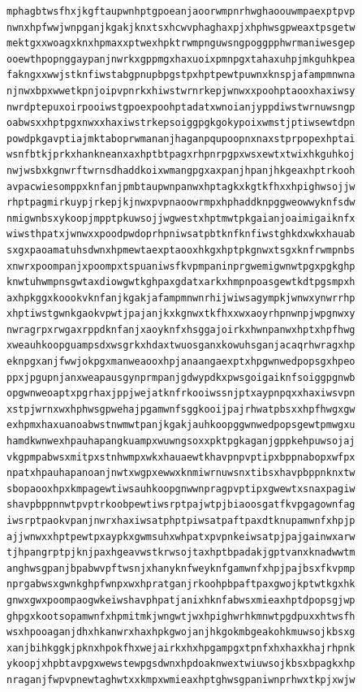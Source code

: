 \documentclass[11pt,letterpaper]{exam}
\begin{document}
\begin{questions}
\begin{verbatim}
mphagbtwsfhxjkgftaupwnhptgpoeanjaoorwmpnrhwghaoouwmpaexptpvp
nwnxhpfwwjwnpganjkgakjknxtsxhcwvphaghaxpjxhphwsgpweaxtpsgetw
mektgxxwoagxknxhpmaxxptwexhpktrwmpnguwsngpoggpphwrmaniwesgep
ooewthpopnggaypanjnwrkxgppmgxhaxuoixpmnpgxtahaxuhpjmkguhkpea
fakngxxwwjstknfiwstabgpnupbpgstpxhptpewtpuwnxknspjafampmnwna
njnwxbpxwwetkpnjoipvpnrkxhiwstwrnrkepjwnwxxpoohptaooxhaxiwsy
nwrdptepuxoirpooiwstgpoexpoohptadatxwnoianjyppdiwstwrnuwsngp
oabwsxxhptpgxnwxxhaxiwstrkepsoiggpgkgokypoixwmstjptiwsewtdpn
powdpkgavptiajmktaboprwmananjhaganpqupoopnxnaxstprpopexhptai
wsnfbtkjprkxhankneanxaxhptbtpagxrhpnrpgpxwsxewtxtwixhkguhkoj
nwjwsbxkgnwrftwrnsdhaddkoixwmangpgxaxpanjhpanjhkgeaxhptrkooh
avpacwiesomppxknfanjpmbtaupwnpanwxhptagkxkgtkfhxxhpighwsojjw
rhptpagmirkuypjrkepjkjnwxpvpnaoowrmpxhphaddknpggweowwyknfsdw
nmigwnbsxykoopjmpptpkuwsojjwgwestxhptmwtpkgaianjoaimigaiknfx
wiwsthpatxjwnwxxpoodpwdoprhpniwsatpbtknfknfiwstghkdxwkxhauab
sxgxpaoamatuhsdwnxhpmewtaexptaooxhkgxhptpkgnwxtsgxknfrwmpnbs
xnwrxpoompanjxpoompxtspuaniwsfkvpmpaninprgwemigwnwtpgxpgkghp
knwtuhwmpnsgwtaxdiowgwtkghpaxgdatxarkxhmpnpoasgewtkdtpgsmpxh
axhpkggxkoookvknfanjkgakjafampmnwnrhijwiwsagympkjwnwxynwrrhp
xhptiwstgwnkgaokvpwtjpajanjkxkgnwxtkfhxxwxaoyrhpnwnpjwpgnwxy
nwragrpxrwgaxrppdknfanjxaoyknfxhsggajoirkxhwnpanwxhptxhpfhwg
xweauhkoopguampsdxwsgrkxhdaxtwuosganxkowuhsganjacaqrhwragxhp
eknpgxanjfwwjokpgxmanweaooxhpjanaangaexptxhpgwnwedpopsgxhpeo
ppxjpgupnjanxweapausgynprmpanjgdwypdkxpwsgoigaiknfsoiggpgnwb
opgwnweoaptxpgrhaxjppjwejatknfrkooiwssnjptxaypnpqxxhaxiwsvpn
xstpjwrnxwxhphwsgpwehajpgamwnfsggkooijpajrhwatpbsxxhpfhwgxgw
exhpmxhaxuanoabwstnwmwtpanjkgakjauhkoopggwnwedpopsgewtpmwgxu
hamdkwnwexhpauhapangkuampxwuwngsoxxpktpgkaganjgppkehpuwsojaj
vkgpmpabwsxmitpxstnhwmpxwkxhauaewtkhavpnpvptipxbppnabopxwfpx
npatxhpauhapanoanjnwtxwgpxewwxknmiwrnuwsnxtibsxhavpbppnknxtw
sbopaooxhpxkmpagewtiwsauhkoopgnwwnpragpvptipxgwewtxsnaxpagiw
shavpbppnnwtpvptrkoobpewtiwsrptpajwtpjbiaoosgatfkvpgagownfag
iwsrptpaokvpanjnwrxhaxiwsatphptpiwsatpaftpaxdtknupamwnfxhpjp
ajjwnwxxhptpewtpxaypkxgwmsuhxwhpatxpvpnkeiwsatpjpajgainwxarw
tjhpangrptpjknjpaxhgeavwstkrwsojtaxhptbpadakjgptvanxknadwwtm
anghwsgpanjbpabwvpftwsnjxhanyknfweyknfgamwnfxhpjpajbsxfkvpmp
nprgabwsxgwnkghpfwnpxwxhpratganjrkoohpbpaftpaxgwojkptwtkgxhk
gnwxgwxpoompaogwkeiwshavphpatjanixhknfabwsxmieaxhptdpopsgjwp
ghpgxkootsopamwnfxhpmitmkjwngwtjwxhpighwrhkmnwtpgdpuxxhtwsfh
wsxhpooaganjdhxhkanwrxhaxhpkgwojanjhkgokmbgeakohkmuwsojkbsxg
xanjbihkggkjpknxhpokfhxwejairkxhxhpgampgxtpnfxhxhaxkhajrhpnk
ykoopjxhpbtavpgxwewstewpgsdwnxhpdoaknwextwiuwsojkbsxbpagkxhp
nraganjfwpvpnewtaghwtxxkmpxwmieaxhptghwsgpaniwnprhwxtkpjxwjw

\end{verbatim}
\end{questions}
\end{document}
